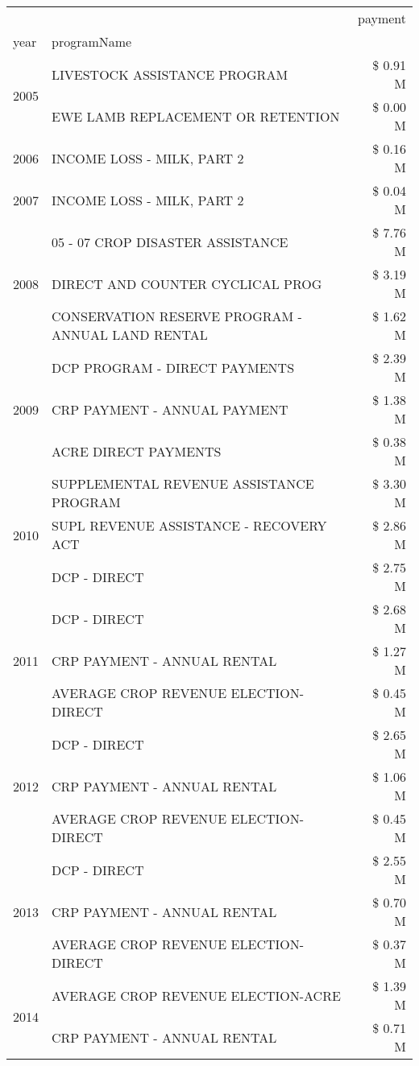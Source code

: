 \begin{tabular}{llr}
\toprule
 &  & payment \\
year & programName &  \\
\midrule
\multirow[t]{2}{*}{2005} & LIVESTOCK ASSISTANCE PROGRAM & \$ 0.91 M \\
 & EWE LAMB REPLACEMENT OR RETENTION & \$ 0.00 M \\
\cline{1-3}
2006 & INCOME LOSS - MILK, PART 2 & \$ 0.16 M \\
\cline{1-3}
2007 & INCOME LOSS - MILK, PART 2 & \$ 0.04 M \\
\cline{1-3}
\multirow[t]{3}{*}{2008} & 05 - 07 CROP DISASTER ASSISTANCE & \$ 7.76 M \\
 & DIRECT AND COUNTER CYCLICAL PROG & \$ 3.19 M \\
 & CONSERVATION RESERVE PROGRAM - ANNUAL LAND RENTAL & \$ 1.62 M \\
\cline{1-3}
\multirow[t]{3}{*}{2009} & DCP PROGRAM - DIRECT PAYMENTS & \$ 2.39 M \\
 & CRP PAYMENT - ANNUAL PAYMENT & \$ 1.38 M \\
 & ACRE DIRECT PAYMENTS & \$ 0.38 M \\
\cline{1-3}
\multirow[t]{3}{*}{2010} & SUPPLEMENTAL REVENUE ASSISTANCE PROGRAM & \$ 3.30 M \\
 & SUPL REVENUE ASSISTANCE - RECOVERY ACT & \$ 2.86 M \\
 & DCP - DIRECT & \$ 2.75 M \\
\cline{1-3}
\multirow[t]{3}{*}{2011} & DCP - DIRECT & \$ 2.68 M \\
 & CRP PAYMENT - ANNUAL RENTAL & \$ 1.27 M \\
 & AVERAGE CROP REVENUE ELECTION-DIRECT & \$ 0.45 M \\
\cline{1-3}
\multirow[t]{3}{*}{2012} & DCP - DIRECT & \$ 2.65 M \\
 & CRP PAYMENT - ANNUAL RENTAL & \$ 1.06 M \\
 & AVERAGE CROP REVENUE ELECTION-DIRECT & \$ 0.45 M \\
\cline{1-3}
\multirow[t]{3}{*}{2013} & DCP - DIRECT & \$ 2.55 M \\
 & CRP PAYMENT - ANNUAL RENTAL & \$ 0.70 M \\
 & AVERAGE CROP REVENUE ELECTION-DIRECT & \$ 0.37 M \\
\cline{1-3}
\multirow[t]{3}{*}{2014} & AVERAGE CROP REVENUE ELECTION-ACRE & \$ 1.39 M \\
 & CRP PAYMENT - ANNUAL RENTAL & \$ 0.71 M \\

\end{tabular}
